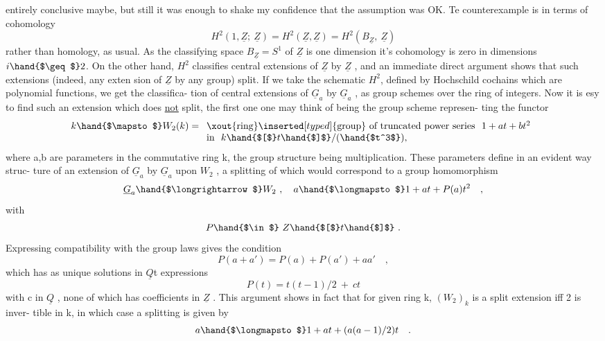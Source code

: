 entirely conclusive maybe,  but still it was enough to shake my confidence
that the assumption was OK.  Te counterexample is in terms of cohomology
\[ H^2(1,\underline{Z};\ \underline{Z}) = H^2(\underline{Z},\underline{Z}) = H^2(B_{\underline{Z}},\ \underline{Z}) \]
rather than homology, as usual.   As the classifying space $B_{\underline{Z}} = S^1$ of $\underline{Z}$
is one dimension it's cohomology is zero in dimensions $i \hand{$\geq$} 2$.  On the 
other hand,  $H^2$ classifies central extensions of $\underline{Z}$ by $\underline{Z}$ ,  and an
immediate direct argument shows  that such extensions (indeed, any exten%
\hand{-}sion of $\underline{Z}$ by any group) split.  If we take the schematic $H^2$,  defined by
Hochschild cochains which are polynomial functions,  we get the classifica-%
tion of central extensions of $\underline{G}_a$ by $\underline{G}_a$  ,  as group schemes over
the ring of integers.  Now it is esy to find such an extension which does
\uline{not} split,  the first one one may think of being the group scheme represen-%
ting the functor
\[ k \hand{$\mapsto$} W_2(k) = \begin{array}[t]{l} \xout{\text{ring}}\inserted[typed]{\text{group}}\text{ of truncated power series }\ 1+at+bt^2 \\ \text{in }\ k\hand{$[$}t\hand{$]$}/(\hand{$t^3$}), \end{array} \]
where a,b are parameters in the commutative ring k,  the group structure
being multiplication.  These parameters define in an evident way  struc-%
ture of an extension of $\underline{G}_a$ by $\underline{G}_a$ upon $W_2$ ,  a splitting of which would
correspond to a group homomorphism
\[ \underline{G}_a \hand{$\longrightarrow$} W_2 \ , \quad a \hand{$\longmapsto$} 1 + at + P(a)t^2 \quad , \]
with
\[ P \hand{$\in$}\ Z\hand{$[$}t\hand{$]$} \ . \]
Expressing compatibility with the group laws gives the condition
\[ P(a+a') = P(a) + P(a') + aa' \quad , \]
which has\hand{,} as unique solutions  in  $\underline{Q}$\hand{$[$}t\hand{$]$}\hand{,} expressions
\[ P(t) = t(t-1)/2 \ + \ ct \]
with c in $\underline{Q}$ ,  none of which has coefficients in $\underline{Z}$ . \deleted{\unsure{(}}This argument shows
in fact that for given ring k, $(W_2)_k$ is a split extension iff 2 is inver-%
tible in k,  in which case a splitting is given by
\[ a \hand{$\longmapsto$} 1 + at +(a(a-1)/2)t \quad . \]

